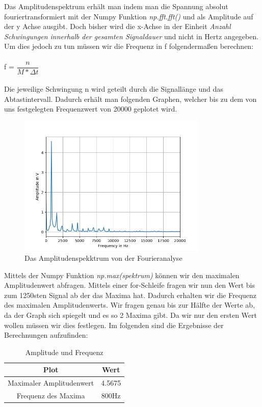 \documentclass[12pt, oneside, a4paper, \docLanguage]{report}
\begin{document}
\newpage
Das Amplitudenspektrum erhält man indem man die Spannung absolut fouriertransformiert mit der Numpy Funktion \textit{np.fft.fft()} und als Amplitude auf der y Achse ausgibt. 
\newline
Doch bisher wird die x-Achse in der Einheit \textit{Anzahl Schwingungen innerhalb der gesamten Signaldauer} und nicht in Hertz angegeben. 
\newline
Um dies jedoch zu tun müssen wir die Frequenz in f folgendermaßen berechnen:
\\~\\
f = $\dfrac{n}{M * \Delta t}$
\\~\\
Die jeweilige Schwingung n wird geteilt durch die Signallänge und das Abtastintervall.
Dadurch erhält man folgenden Graphen, welcher bis zu dem von uns festgelegten Frequenzwert von 20000 geplotet wird.
\begin{figure}[H]
	\centering\small
	\includegraphics[width=0.8\textwidth]{../data/img/mundharmonika2.png}
	\caption{Das Amplitudenspekktrum von der Fourieranalyse}
	\label{img:Das Amplitudenspekktrum von der Fourieranalyse}
\end{figure}
\newpage
Mittels der Numpy Funktion \textit{np.max(spektrum)} können wir den maximalen Amplitudenwert abfragen.
Mittels einer for-Schleife fragen wir nun den Wert bis zum 1250sten Signal ab der das Maxima hat.
\newline 
Dadurch erhalten wir die Frequenz des maximalen Amplitudenwerts.
Wir fragen genau bis zur Hälfte der Werte ab, da der Graph sich spiegelt und es so 2 Maxima gibt. Da wir nur den ersten Wert wollen müssen wir dies festlegen.
\newline
Im folgenden sind die Ergebnisse der Berechnungen aufzufinden:
\begin{table}[H]
	\centering\small
	\begin{tabular}{|c|c|}
	\hline
	Plot & Wert \\
	\hline
	Maximaler Amplitudenwert & 4.5675 \\
	\hline
	Frequenz des Maxima & 800Hz \\
	\hline
	\end{tabular}
	\caption{Amplitude und Frequenz}
	\label{fig:VERSUCH_1_MESSWERTE}
\end{table}
\newpage
\end{document}
